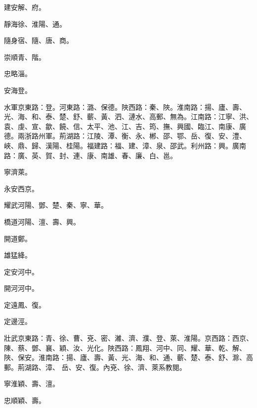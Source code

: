 \begin{pinyinscope}
 建安解、府。



 靜海徐、淮陽、通。



 隨身宿、隨、唐、商。



 崇順青、階。



 忠略淄。



 安海登。



 水軍京東路：登。河東路：潞、保德。陜西路：秦、陜。淮南路：揚、廬、壽、光、海、和、泰、楚、舒、蘄、黃、泗、漣水、高郵、無為。江南路：江寧、洪、袁、虔、宣、歙、饒、信、太平、池、江、吉、筠、撫、興國、臨江、南康、廣德。兩浙路州軍。荊湖路：江陵、潭、衡、永、郴、邵、鄂、岳、復、安、澧、峽、鼎、歸、漢陽、桂陽。福建路：福、建、漳、泉、邵武。利州路：興。廣南路：廣、英、賀、封、連、康、南雄、春、廉、白、邕。



 寧濟萊。



 永安西京。



 耀武河陽、鄧、楚、秦、寧、華。



 橋道河陽、澶、壽、興。



 開道鄭。



 雄猛絳。



 定安河中。



 開河河中。



 定遠鳳、復。



 定邊涇。



 壯武京東路：青、徐、曹、兗、密、濰、濟、濮、登、萊、淮陽。京西路：西京、陳、蔡、鄧、襄、穎、汝、光化。陜西路：鳳翔、河中、同、耀、華、乾、解、陜、保安。淮南路：揚、廬、壽、黃、光、海、和、通、蘄、楚、泰、舒、滁、高郵。荊湖路、漳、
 岳、安、復。內兗、徐、濟、萊系教閱。



 寧淮穎、壽、澶。



 忠順穎、壽。




\end{pinyinscope}
